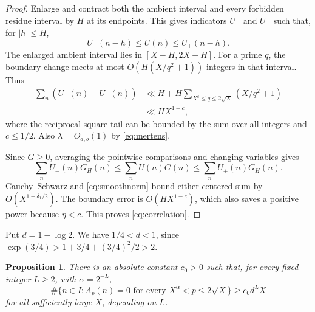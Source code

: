 \documentclass[11pt,reqno]{amsart}
\newtheorem{proposition}[theorem]{Proposition}
\theoremstyle{remark}
\numberwithin{equation}{section}
\begin{document}
\begin{proof}
Enlarge and contract both the ambient interval and every forbidden
residue interval by $H$ at its endpoints. This gives indicators
$U_-$ and $U_+$ such that, for $|h|\leq H$,
\[
 U_-(n-h)\leq U(n)\leq U_+(n-h).
\]
The enlarged ambient interval lies in $[X-H,2X+H]$.
For a prime $q$, the boundary change meets at most
$O(H(X/q^2+1))$ integers in that interval. Thus
\begin{align*}
 \sum_n(U_+(n)-U_-(n))
 &\ll H+H\sum_{X^c\leq q\leq2\sqrt X}(X/q^2+1)\\
 &\ll HX^{1-c},
\end{align*}
where the reciprocal-square tail can be bounded by the sum over all
integers and $c\leq1/2$. Also $\lambda=O_{a,b}(1)$ by
\eqref{eq:mertens}.

Since $G\geq0$, averaging the pointwise comparisons and changing
variables gives
\[
 \sum_n U_-(n)G_H(n)\leq\sum_nU(n)G(n)
 \leq\sum_nU_+(n)G_H(n).
\]
Cauchy--Schwarz and \eqref{eq:smoothnorm} bound either centered
sum by $O(X^{1-\delta_1/2})$.
The boundary error is $O(HX^{1-c})$, which also saves a positive
power because $\eta<c$. This proves \eqref{eq:correlation}.
\end{proof}

Put $d=1-\log2$. We have $1/4<d<1$, since
$\exp(3/4)>1+3/4+(3/4)^2/2>2$.

\begin{proposition}\label{prop:large}
There is an absolute constant $c_0>0$ such that, for every fixed
integer $L\geq2$, with $\alpha=2^{-L}$,
\begin{equation}\label{eq:largecount}
 \#\{n\in I:A_p(n)=0\text{ for every }X^\alpha<p\leq2\sqrt X\}
 \geq c_0d^L X
\end{equation}
for all sufficiently large $X$, depending on $L$.
\end{proposition}
\end{document}
